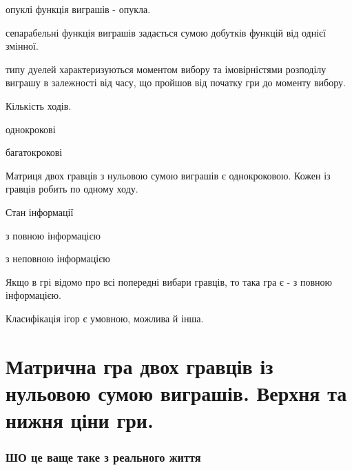 \documentclass[12pt,a4paper]{report}
\newenvironment{slim_enumerate}{
\begin{enumerate}
  \setlength{\itemsep}{1pt}
  \setlength{\parskip}{0pt}
  \setlength{\parsep}{0pt}}
{\end{enumerate}}
\newenvironment{slim_itemize}{
\begin{itemize}
  \setlength{\itemsep}{1pt}
  \setlength{\parskip}{0pt}
  \setlength{\parsep}{0pt}}
{\end{itemize}}
\newenvironment{slim_description}{
\begin{description}
  \setlength{\itemsep}{1pt}
  \setlength{\parskip}{0pt}
  \setlength{\parsep}{0pt}}
{\end{description}}
\begin{document}
\begin{slim_enumerate}
\begin{slim_description}
    \item[опуклі] функція виграшів - опукла.
    \item[сепарабельні] функція виграшів задається сумою добутків функцій від однієї змінної.
    \item[типу дуелей] характеризуються моментом вибору та імовірністями розподілу виграшу в залежності від часу, що пройшов від початку гри до моменту вибору.
  \end{slim_description}
  \item Кількість ходів.
  \begin{slim_itemize}
    \item однокрокові
    \item багатокрокові
  \end{slim_itemize}
  Матриця двох гравців з нульовою сумою виграшів є однокроковою. Кожен із гравців робить по одному ходу.
  \item Стан інформації
  \begin{slim_itemize}
    \item з повною інформацією
    \item з неповною інформацією
  \end{slim_itemize}
  Якщо в грі відомо про всі попередні вибари гравців, то така гра є - з повною інформацією.
\end{slim_enumerate}

Класифікація ігор є умовною, можлива й інша.

\clearpage

\chapter{Матрична гра двох гравців із нульовою сумою виграшів. Верхня та нижня ціни гри.}

\subsection*{ШО це ваще таке з реального життя}
\end{document}
